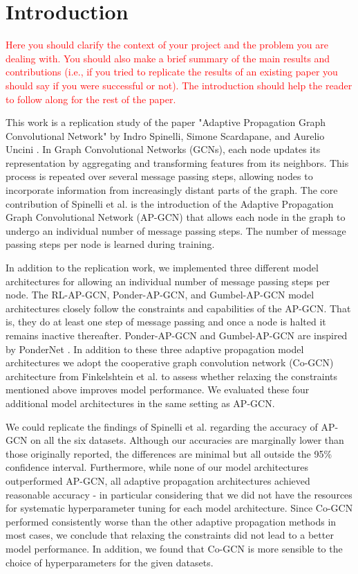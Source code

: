 \documentclass{gdl}
\begin{document}
\maketitle

\section{Introduction}

\textcolor{red}{Here you should clarify the context of your project and the problem you are dealing with. You should also make a brief summary of the main results and contributions (i.e., if you tried to replicate the results of an existing paper you should say if you were successful or not). The introduction should help the reader to follow along for the rest of the paper.}

This work is a replication study of the paper "Adaptive Propagation Graph Convolutional Network" by Indro Spinelli, Simone Scardapane, and Aurelio Uncini \cite{spinelli2021}. In Graph Convolutional Networks (GCNs), each node updates its representation by aggregating and transforming features from its neighbors. This process is repeated over several message passing steps, allowing nodes to incorporate information from increasingly distant parts of the graph. The core contribution of Spinelli et al. is the introduction of the Adaptive Propagation Graph Convolutional Network (AP-GCN) that allows each node in the graph to undergo an individual number of message passing steps. The number of message passing steps per node is learned during training.

In addition to the replication work, we implemented three different model architectures for allowing an individual number of message passing steps per node. The RL-AP-GCN, Ponder-AP-GCN, and Gumbel-AP-GCN model architectures closely follow the constraints and capabilities of the AP-GCN. That is, they do at least one step of message passing and once a node is halted it remains inactive thereafter. Ponder-AP-GCN and Gumbel-AP-GCN are inspired by PonderNet \cite{banino2021}. In addition to these three adaptive propagation model architectures we adopt the cooperative graph convolution network (Co-GCN) architecture from Finkelshtein et al. \cite{finkelshtein2024} to assess whether relaxing the constraints mentioned above improves model performance. We evaluated these four additional model architectures in the same setting as AP-GCN.

We could replicate the findings of Spinelli et al. regarding the accuracy of AP-GCN on all the six datasets. Although our accuracies are marginally lower than those originally reported, the differences are minimal but all outside the 95\% confidence interval. 
Furthermore, while none of our model architectures outperformed AP-GCN, all adaptive propagation architectures achieved reasonable accuracy - in particular considering that we did not have the resources for systematic hyperparameter tuning for each model architecture. Since Co-GCN performed consistently worse than the other adaptive propagation methods in most cases, we conclude that relaxing the constraints did not lead to a better model performance. In addition, we found that Co-GCN is more sensible to the choice of hyperparameters for the given datasets.
\end{document}
